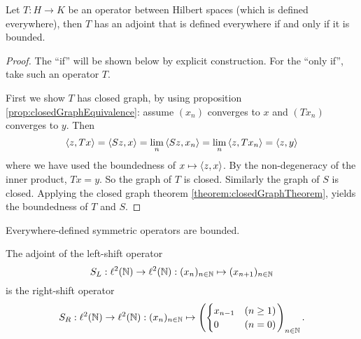 \begin{theorem}
Let $T: H\to K$ be an operator between Hilbert spaces (which is defined everywhere), then $T$ has an adjoint that is defined everywhere \textup{if and only if} it is bounded.
\end{theorem}
\begin{proof}
The ``if'' will be shown below by explicit construction. For the ``only if'', take such an operator $T$.

First we show $T$ has closed graph, by using proposition \ref{prop:closedGraphEquivalence}: assume $(x_n)$ converges to $x$ and $(Tx_n)$ converges to $y$. Then
\[ \left\langle z, Tx \right\rangle = \left\langle Sz,x \right\rangle = \lim_n\left\langle Sz, x_n \right\rangle = \lim_n\left\langle z, Tx_n \right\rangle = \left\langle z, y \right\rangle \]
where we have used the boundedness of $x\mapsto\left\langle z,x \right\rangle$. By the non-degeneracy of the inner product, $Tx = y$. So the graph of $T$ is closed. Similarly the graph of $S$ is closed. Applying the closed graph theorem \ref{theorem:closedGraphTheorem}, yields the boundedness of $T$ and $S$.
\end{proof}
\begin{corollary}
Everywhere-defined symmetric operators are bounded.
\end{corollary}

\begin{example}
The adjoint of the left-shift operator
\[ S_L: \ell^2(\mathbb{N}) \to \ell^2(\mathbb{N}): (x_n)_{n\in\mathbb{N}} \mapsto (x_{n+1})_{n\in\mathbb{N}} \]
is the right-shift operator
\[ S_R: \ell^2(\mathbb{N}) \to \ell^2(\mathbb{N}): (x_n)_{n\in\mathbb{N}} \mapsto \left(\begin{cases}
x_{n-1} & (n\geq 1) \\ 0 &(n=0)
\end{cases}\right)_{n\in \mathbb{N}}. \]
\end{example}

